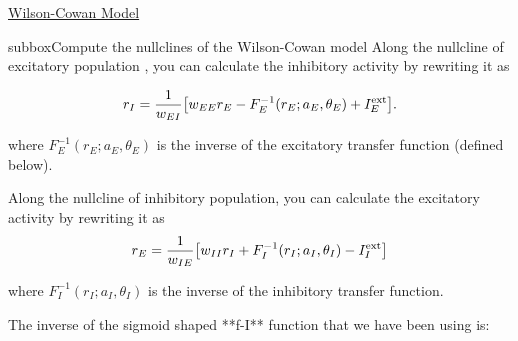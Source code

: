 \begin{textbox}{\href{https://compneuro.neuromatch.io/tutorials/W2D4_DynamicNetworks/chapter_title.html}{Wilson-Cowan Model } }

\begin{subbox}{subbox}{Compute the nullclines of the Wilson-Cowan model}
\scriptsize
Along the nullcline of excitatory population , you can calculate the inhibitory activity by rewriting it as 

\begin{align*}
r_I = \frac{1}{w_{EI}}\big{[}w_{EE}r_E - F_E^{-1}(r_E; a_E,\theta_E) + I^{\text{ext}}_E \big{]}.
\end{align*}

where $F_E^{-1}(r_E; a_E,\theta_E)$ is the inverse of the excitatory transfer function (defined below). 

Along the nullcline of inhibitory population, you can calculate the excitatory activity by rewriting it as  
\begin{align*}
r_E = \frac{1}{w_{IE}} \big{[} w_{II}r_I + F_I^{-1}(r_I;a_I,\theta_I) - I^{\text{ext}}_I \big{]}  
\end{align*}

where $F_I^{-1}(r_I; a_I,\theta_I)$ is the inverse of the inhibitory transfer function.

The inverse of the sigmoid shaped **f-I** function that we have been using is:


\end{subbox}
\end{textbox}
